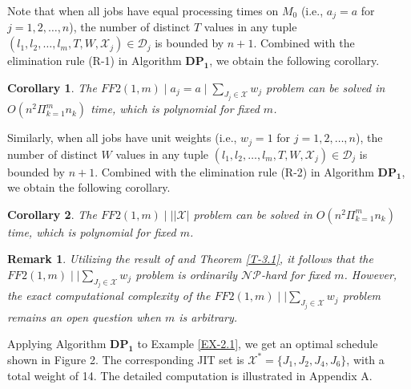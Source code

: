 \documentclass[12pt, eqno, limlimits]{article}
\newtheorem{cor}{Corollary}[section]
\newtheorem{rem}{Remark}[section]
\begin{document}
\begin{sloppypar}
        Note that when all jobs have equal processing times on $M_0$ (i.e., $a_j=a$ for $j=1, 2, \ldots, n$), the number of distinct $T$ values in any tuple $(l_1, l_2, \ldots, l_m, T, W, \mathcal{X}_j) \in \mathcal{D}_j$ is bounded by $n+1$. Combined with the elimination rule (R-1) in Algorithm $\mathbf{DP_1}$, we obtain the following corollary.
        
        \begin{cor} \label{C-3.1}
            The $FF2(1, m)\mid a_j=a \mid \sum_{J_j \in \mathcal{X}} w_j$ problem can be solved in $O(n^2 \Pi_{k=1}^m n_k)$ time, which is polynomial for fixed $m$.
        \end{cor}
        
        Similarly, when all jobs have unit weights (i.e., $w_j=1$ for $j=1, 2, \ldots, n$), the number of distinct $W$ values in any tuple $(l_1, l_2, \ldots, l_m, T, W, \mathcal{X}_j) \in \mathcal{D}_j$ is bounded by $n+1$. Combined with the elimination rule (R-2) in Algorithm $\mathbf{DP_1}$, we obtain the following corollary.
        
        \begin{cor} \label{C-3.2}
            The $FF2(1, m)\mid \mid |\mathcal{X}|$ problem can be solved in $O(n^2 \Pi_{k=1}^m n_k)$ time, which is polynomial for fixed $m$.  
        \end{cor}
        
        \begin{rem}\label{R-3.1}
            Utilizing the result of \cite{ChoiYoon2007JOS} and Theorem \ref{T-3.1}, it follows that the $FF2(1, m)\mid \mid \sum_{J_j \in \mathcal{X}} w_j$ problem is ordinarily $\mathcal{NP}$-hard for fixed $m$. However, the exact computational complexity of the $FF2(1, m)\mid \mid \sum_{J_j \in \mathcal{X}} w_j$ problem remains an open question when $m$ is arbitrary.
        \end{rem}
        
        Applying Algorithm $\mathbf{DP_1}$ to Example \ref{EX-2.1}, we get an optimal schedule shown in Figure 2. The corresponding JIT set is $\mathcal{X}^{*}=\{J_1, J_2, J_4, J_6\}$, with a total weight of 14. The detailed computation is illustrated in Appendix A. 
        \begin{center}
\end{center}
\end{sloppypar}
\end{document}
